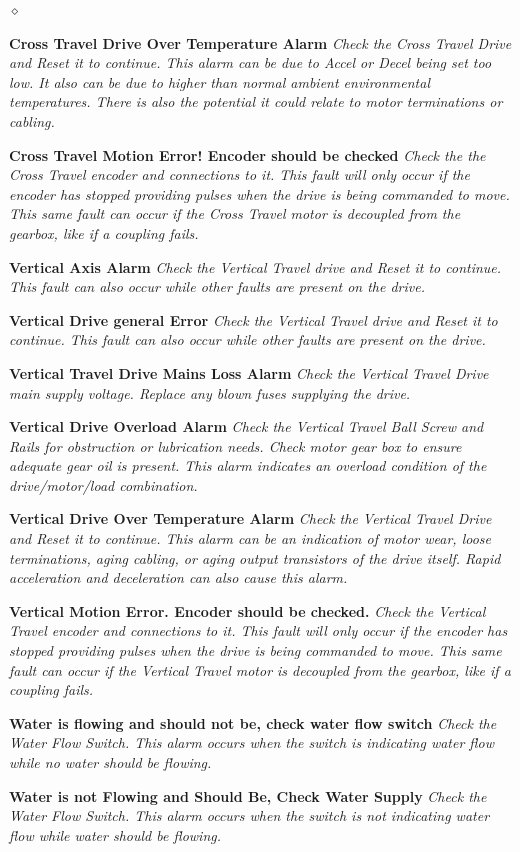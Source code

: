 \begin{list}{$\diamond$}{}
	\item \textbf{Cross Travel Drive Over Temperature Alarm} \textit{Check the Cross Travel Drive and Reset it to continue. This alarm can be due to Accel or Decel being set too low. It also can be due to higher than normal ambient environmental temperatures. There is also the potential it could relate to motor terminations or cabling.}
	\item \textbf{Cross Travel Motion Error! Encoder should be checked} \textit{Check the the Cross Travel encoder and connections to it. This fault will only occur if the encoder has stopped providing pulses when the drive is being commanded to move. This same fault can occur if the Cross Travel motor is decoupled from the gearbox, like if a coupling fails.}
	\item \textbf{Vertical Axis Alarm} \textit{Check the Vertical Travel drive and Reset it to continue. This fault can also occur while other faults are present on the drive.}
	\item \textbf{Vertical Drive general Error} \textit{Check the Vertical Travel drive and Reset it to continue. This fault can also occur while other faults are present on the drive.}
	\item \textbf{Vertical Travel Drive Mains Loss Alarm} \textit{Check the Vertical Travel Drive main supply voltage. Replace any blown fuses supplying the drive.}
	\item \textbf{Vertical Drive Overload Alarm} \textit{Check the Vertical Travel Ball Screw and Rails for obstruction or lubrication needs. Check motor gear box to ensure adequate gear oil is present. This alarm indicates an overload condition of the drive/motor/load combination.}
	\item \textbf{Vertical Drive Over Temperature Alarm} \textit{Check the Vertical Travel Drive and Reset it to continue. This alarm can be an indication of motor wear, loose terminations, aging cabling, or aging output transistors of the drive itself. Rapid acceleration and deceleration can also cause this alarm.}
	\item \textbf{Vertical Motion Error. Encoder should be checked.} \textit{Check the Vertical Travel encoder and connections to it. This fault will only occur if the encoder has stopped providing pulses when the drive is being commanded to move. This same fault can occur if the Vertical Travel motor is decoupled from the gearbox, like if a coupling fails.}
	\item \textbf{Water is flowing and should not be, check water flow switch} \textit{Check the Water Flow Switch. This alarm occurs when the switch is indicating water flow while no water should be flowing.}
	\item \textbf{Water is not Flowing and Should Be, Check Water Supply} \textit{Check the Water Flow Switch. This alarm occurs when the switch is not indicating water flow while water should be flowing.}
\end{list}									

